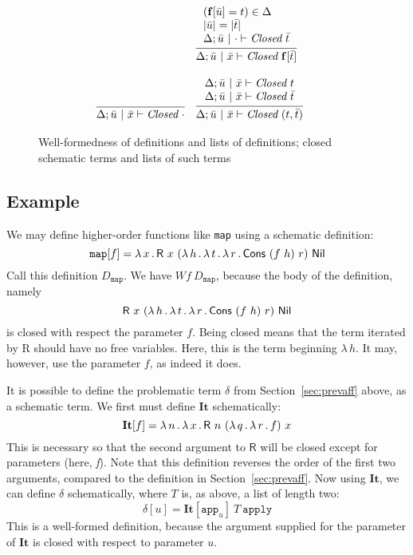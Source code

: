 \documentclass{article}
\begin{document}
\begin{figure}
\[\begin{array}{lll}
   &\infer{\Delta;\bar{u}\ |\ \bar{x}\vdash\textit{Closed}\ \mathbf{f}[\bar{t}]}
        {\begin{array}{l}
             (\mathbf{f}[\bar{u}] = t) \in \Delta \\
            |\bar{u}| = |\bar{t}| \\
           \Delta;\bar{u}\ |\ \cdot \vdash \textit{Closed}\ \bar{t}
         \end{array}} 
\\ \\
\infer{\Delta;\bar{u}\ |\ \bar{x}\vdash \textit{Closed}\ \cdot}{\ }&
\infer{\Delta;\bar{u}\ |\ \bar{x}\vdash \textit{Closed}\ (t,\bar{t})}
  {\begin{array}{l}
    \Delta;\bar{u}\ |\ \bar{x}\vdash \textit{Closed}\ t \\
    \Delta;\bar{u}\ |\ \bar{x}\vdash \textit{Closed}\ \bar{t}
\end{array}}&\ 
   \end{array}
  \]
  \caption{Well-formedness of definitions and lists of definitions; closed schematic terms and lists of such terms}
\label{fig:sarwf}
\end{figure}

\subsection{Example}

We may define higher-order functions like \texttt{map} using a schematic definition:
\[
\texttt{map}[f] = \lam{x}{\mathsf{R}\ x\ (\lam{h}{\lam{t}{\lam{r}{\mathsf{Cons}\ (f\ h)\ r}}})\ \mathsf{Nil}}
\]
\noindent Call this definition $D_{\texttt{map}}$.  We have $\textit{Wf}\ D_{\texttt{map}}$, because the
body of the definition, namely
\[
\mathsf{R}\ x\ (\lam{h}{\lam{t}{\lam{r}{\mathsf{Cons}\ (f\ h)\ r}}})\ \mathsf{Nil}
\]
\noindent is closed with respect the parameter $f$.  Being closed
means that the term iterated by \textsf{R} should have no free
variables.  Here, this is the term beginning $\lambda\, h$.  It may,
however, use the parameter $f$, as indeed it does.

It is possible to define the problematic term $\delta$ from
Section~\ref{sec:prevaff} above, as a schematic term.  We first
must define $\mathbf{It}$ schematically:
\[
\mathbf{It}[f] = \lambda\, n\, .\, \lambda\, x\, .\, \mathsf{R}\ n\ (\lambda\, q\, .\, \lambda\, r\, .\, f)\ x
\]
\noindent This is necessary so that the second argument to $\mathsf{R}$ will
be closed except for parameters (here, \textit{f}).  Note that this definition
reverses the order of the first two arguments, compared to the definition
in Section~\ref{sec:prevaff}.  Now using $\mathbf{It}$,
we can define $\delta$ schematically, where $T$ is, as above, a list of length two:
\[
\delta[u] = \mathbf{It}[\texttt{app}_u]\ T\ \texttt{apply}
\]
\noindent This is a well-formed definition, because the argument supplied for
the parameter of $\mathbf{It}$ is closed with respect to parameter $u$.
\end{document}
